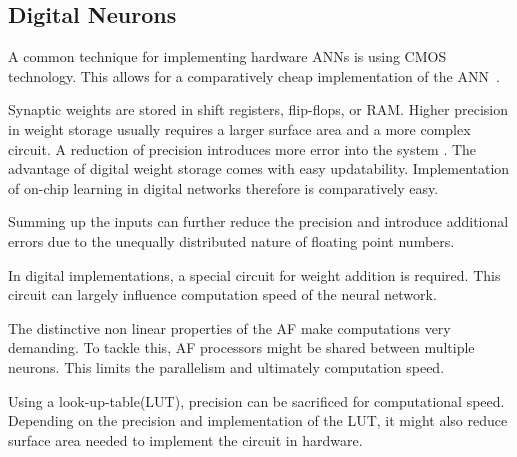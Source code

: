 \documentclass[conference]{IEEEtran}
\begin{document}
    \subsection{Digital Neurons}

    A common technique for implementing hardware ANNs is using CMOS technology.
    This allows for a comparatively cheap implementation of the ANN~\cite{misra2010artificial}.

    Synaptic weights are stored in shift registers, flip-flops, or RAM\@.
    Higher precision in weight storage usually requires a larger surface area and a more complex circuit.
    A reduction of precision introduces more error into the system \cite{Nichols02feasibilityof}.
    The advantage of digital weight storage comes with easy updatability.
    Implementation of on-chip learning in digital networks therefore is comparatively easy.

    Summing up the inputs can further reduce the precision and introduce additional errors due to the unequally distributed nature of floating point numbers.

    In digital implementations, a special circuit for weight addition is required.
    This circuit can largely influence computation speed of the neural network.

    The distinctive non linear properties of the AF make computations very demanding.
    To tackle this, AF processors might be shared between multiple neurons.
    This limits the parallelism and ultimately computation speed.


    Using a look-up-table(LUT), precision can be sacrificed for computational speed.
    Depending on the precision and implementation of the LUT, it might also reduce surface area needed to implement the circuit in hardware.



\end{document}

